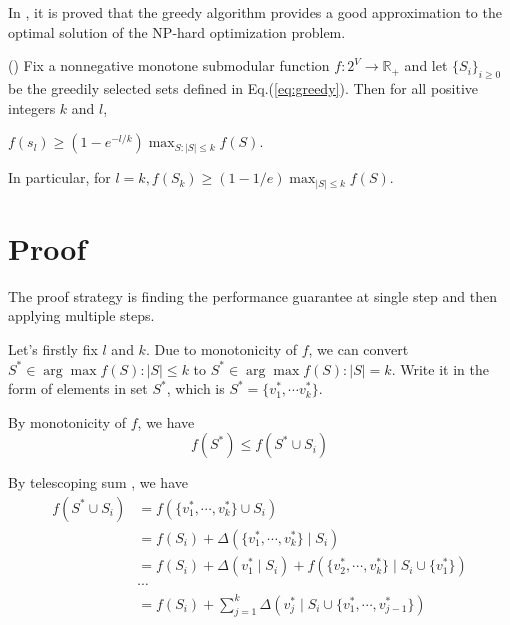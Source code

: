 \documentclass[12pt]{article}
\begin{document}
In \cite{nemhauser1978analysis}, it is proved that the greedy algorithm provides a good approximation to the optimal solution of the NP-hard optimization problem.

\begin{thm} 
\label{thm:submax}
(\cite{nemhauser1978analysis}) Fix a nonnegative monotone submodular function $ f : 2^{V} \rightarrow \mathbb{R}_{+} $ and let $ {\{S_{i}\}}_{i\geq0} $ be the greedily selected sets defined in Eq.(\ref{eq:greedy}). Then for all positive integers $ k $ and $ l $, 
\begin{center}
$ f(s_{l}) \geq (1-e^{-l/k}) \max_{S:|S| \leq k} f(S) $.
\end{center}
In particular, for $ l = k, f(S_{k}) \geq (1-1/e) \max_{|S| \leq k} f(S) $.
\end{thm}

\section{Proof}

The proof strategy is finding the performance guarantee at single step and then applying multiple steps.

Let's firstly fix $ l $ and $ k $. Due to monotonicity of $ f $, we can convert $ S^{*} \in \arg \max {f(S): |S| \leq k} $ to $ S^{*} \in \arg \max {f(S): |S| = k} $. Write it in the form of elements in set $ S^{*} $, which is $ S^{*} = \{ v^{*}_{1}, \cdots v^{*}_{k} \} $.

By monotonicity of $ f $, we have
\begin{equation}
\label{eq:monotonicity}
f(S^{*}) \leq f(S^{*} \cup S_{i}) 
\end{equation}

By telescoping sum , we have
\begin{equation}
\label{eq:teleSumDet}
\begin{aligned}
f(S^{*} \cup S_{i}) & = f(\{ v^{*}_{1}, \cdots , v^{*}_{k} \} \cup S_{i}) \\
& = f(S_{i}) + \Delta( \{ v^{*}_{1}, \cdots , v^{*}_{k} \} \mid S_{i} ) \\
& = f(S_{i}) + \Delta( v^{*}_{1} \mid S_{i} ) + f( \{ v^{*}_{2}, \cdots , v^{*}_{k} \} \mid S_{i} \cup \{ v^{*}_{1} \}  ) \\
& \cdots \\
& = f(S_{i}) + \sum_{j=1}^{k} \Delta(v^{*}_{j} \mid S_{i} \cup \{ v^{*}_{1}, \cdots , v^{*}_{j-1} \})
\end{aligned}
\end{equation}
\end{document}

